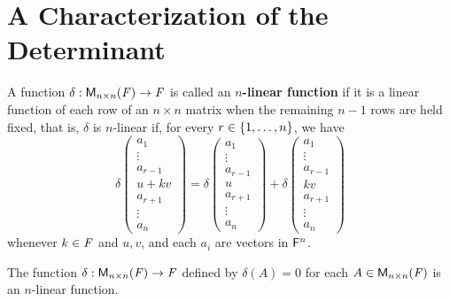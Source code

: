 \section{A Characterization of the Determinant}\label{sec:4.5}

\begin{defn}\label{4.5.1}
	A function \(\delta : \mathsf{M}_{{n} \times n}({\mathit{F}}) \to \mathit{F}\) is called an \textbf{\(n\)-linear function} if it is a linear function of each row of an \(n \times n\) matrix when the remaining \(n - 1\) rows are held fixed, that is, \(\delta\) is \(n\)-linear if, for every \(r \in \left\lbrace1, \dots, n\right\rbrace\), we have
	\[
		\delta\begin{pmatrix}
			a_1       \\
			\vdots    \\
			a_{r - 1} \\
			u + kv    \\
			a_{r + 1} \\
			\vdots    \\
			a_n
		\end{pmatrix} = \delta\begin{pmatrix}
			a_1       \\
			\vdots    \\
			a_{r - 1} \\
			u         \\
			a_{r + 1} \\
			\vdots    \\
			a_n
		\end{pmatrix} + \delta\begin{pmatrix}
			a_1       \\
			\vdots    \\
			a_{r - 1} \\
			kv        \\
			a_{r + 1} \\
			\vdots    \\
			a_n
		\end{pmatrix}
	\]
	whenever \(k \in \mathit{F}\) and \(u, v\), and each \(a_i\) are vectors in \(\mathsf{F}^n\).
\end{defn}

\begin{eg}\label{4.5.2}
	The function \(\delta : \mathsf{M}_{{n} \times n}({\mathit{F}}) \to \mathit{F}\) defined by \(\delta(A) = 0\) for each \(A \in \mathsf{M}_{{n} \times n}({\mathit{F}})\) is an \(n\)-linear function.
\end{eg}

